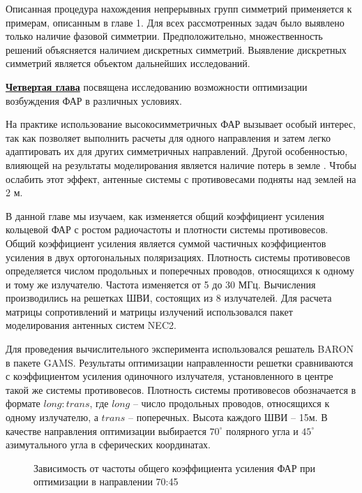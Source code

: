 
Описанная процедура нахождения непрерывных групп симметрий применяется к примерам, описанным в главе 1. Для всех рассмотренных задач было выявлено только наличие фазовой симметрии. Предположительно, множественность решений объясняется наличием дискретных симметрий. Выявление дискретных симметрий является объектом дальнейших исследований.

\underline{\textbf{Четвертая глава}} посвящена исследованию возможности оптимизации возбуждения ФАР в различных условиях.

На практике использование высокосимметричных ФАР вызывает особый интерес, так как позволяет выполнить расчеты для одного направления и затем легко адаптировать их для других симметричных направлений. Другой особенностью, влияющей на результаты моделирования является наличие потерь в земле . Чтобы ослабить этот эффект, антенные системы с противовесами подняты над землей на 2 м.

В данной главе мы изучаем, как изменяется общий коэффициент усиления кольцевой ФАР с ростом радиочастоты и плотности системы противовесов. Общий коэффициент усиления является суммой частичных коэффициентов усиления в  двух ортогональных поляризациях. Плотность системы противовесов определяется числом продольных и поперечных проводов, относящихся к одному и тому же излучателю. Частота изменяется от 5 до 30 МГц. Вычисления производились на решетках ШВИ, состоящих из 8 излучателей. Для расчета матрицы сопротивлений и матрицы излучений использовался пакет моделирования антенных систем NEC2.

Для проведения вычислительного эксперимента использовался решатель BARON в пакете GAMS. Результаты оптимизации направленности решетки сравниваются с коэффициентом усиления одиночного излучателя, установленного в центре такой же системы противовесов. Плотность системы противовесов обозначается в формате $long:trans$, где $long$ -- число продольных проводов, относящихся к одному излучателю, а $trans$ -- поперечных. Высота каждого ШВИ -- 15м. В качестве направления оптимизации выбирается $70^{\circ}$ полярного угла и $45^{\circ}$ азимутального угла в сферических координатах.

\begin{figure}
\caption{Зависимость от частоты общего коэффициента усиления ФАР при оптимизации в направлении 70:45}
\label{ris:paa_gains}
\end{figure}

